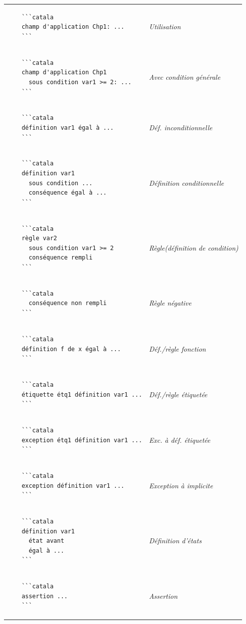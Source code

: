 \documentclass{article}
\makeatletter
\newenvironment{catala}{%
  \VerbatimEnvironment
  \let\FV@ListVSpace\relax
  \begin{verbatim}}%
 {\end{verbatim}}
\makeatother
\begin{document}
\begin{multicols}{3}
\begin{tabular}{@{}p{\cola}>{\slshape}p{\colb}@{}}
  \begin{catala}
    ```catala
    champ d'application Chp1: ...
    ```
  \end{catala}
  & Utilisation
  \\
  \begin{catala}
    ```catala
    champ d'application Chp1
      sous condition var1 >= 2: ...
    ```
  \end{catala}
  & Avec condition générale
  \\
  \begin{catala}
    ```catala
    définition var1 égal à ...
    ```
  \end{catala}
  & Déf. inconditionnelle
  \\
  \begin{catala}
    ```catala
    définition var1
      sous condition ...
      conséquence égal à ...
    ```
  \end{catala}
  & Définition conditionnelle
  \\
  \begin{catala}
    ```catala
    règle var2
      sous condition var1 >= 2
      conséquence rempli
    ```
  \end{catala}
  & Règle\newline(définition de condition)
  \\
  \begin{catala}
    ```catala
      conséquence non rempli
    ```
  \end{catala}
  & Règle négative
  \\
  \begin{catala}
    ```catala
    définition f de x égal à ...
    ```
  \end{catala}
  & Déf./règle fonction
  \\
  \begin{catala}
    ```catala
    étiquette étq1 définition var1 ...
    ```
  \end{catala}
  & Déf./règle étiquetée
  \\
  \begin{catala}
    ```catala
    exception étq1 définition var1 ...
    ```
  \end{catala}
  & Exc. à déf. étiquetée
  \\
  \begin{catala}
    ```catala
    exception définition var1 ...
    ```
  \end{catala}
  & Exception à implicite
  \\
  \begin{catala}
    ```catala
    définition var1
      état avant
      égal à ...
    ```
  \end{catala}
  & Définition d'états
  \\
  \begin{catala}
    ```catala
    assertion ...
    ```
  \end{catala}
  & Assertion
  \\
\end{tabular}


\end{multicols}
\end{document}
